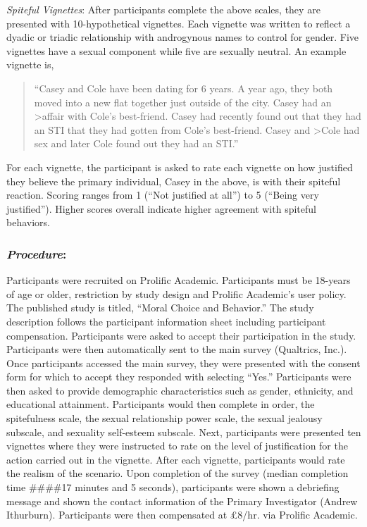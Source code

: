 \documentclass[
  english,
  a4paper]{apa7}
\begin{document}
\emph{Spiteful Vignettes}:
After participants complete the above scales, they are presented with 10-hypothetical vignettes. Each vignette was written to reflect a dyadic or triadic relationship with androgynous names to control for gender. Five vignettes have a sexual component while five are sexually neutral. An example vignette is,

\begin{quote}
``Casey and Cole have been dating for 6 years. A year ago, they both moved into a new flat together just outside of the city. Casey had an \textgreater affair with Cole's best-friend. Casey had recently found out that they had an STI that they had gotten from Cole's best-friend. Casey and \textgreater Cole had sex and later Cole found out they had an STI.''
\end{quote}

For each vignette, the participant is asked to rate each vignette on how justified they believe the primary individual, Casey in the above, is with their spiteful reaction. Scoring ranges from 1 (``Not justified at all'') to 5 (``Being very justified''). Higher scores overall indicate higher agreement with spiteful behaviors.

\hypertarget{procedure}{%
\subsubsection{\texorpdfstring{\emph{Procedure}:}{Procedure:}}\label{procedure}}

Participants were recruited on Prolific Academic. Participants must be 18-years of age or older, restriction by study design and Prolific Academic's user policy. The published study is titled, ``Moral Choice and Behavior.'' The study description follows the participant information sheet including participant compensation. Participants were asked to accept their participation in the study. Participants were then automatically sent to the main survey (Qualtrics, Inc.).\\
Once participants accessed the main survey, they were presented with the consent form for which to accept they responded with selecting ``Yes.'' Participants were then asked to provide demographic characteristics such as gender, ethnicity, and educational attainment. Participants would then complete in order, the spitefulness scale, the sexual relationship power scale, the sexual jealousy subscale, and sexuality self-esteem subscale. Next, participants were presented ten vignettes where they were instructed to rate on the level of justification for the action carried out in the vignette. After each vignette, participants would rate the realism of the scenario. Upon completion of the survey (median completion time \#\#\#\#17 minutes and 5 seconds), participants were shown a debriefing message and shown the contact information of the Primary Investigator (Andrew Ithurburn). Participants were then compensated at £8/hr. via Prolific Academic.
\end{document}

